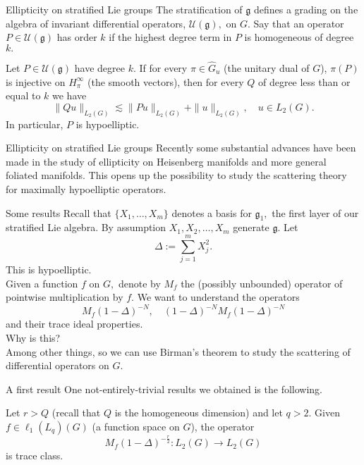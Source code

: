 \documentclass{beamer}
\numberwithin{equation}{section}
\theoremstyle{plain}
\theoremstyle{plain}
\theoremstyle{definition}
\theoremstyle{plain}
\theoremstyle{plain}
\theoremstyle{definition}
\newcommand{\Uc}{\mathcal{U}}
\newcommand{\gf}{\mathfrak{g}}
\begin{document}
\begin{frame}{Ellipticity on stratified Lie groups}
  The stratification of $\gf$ defines a grading on the algebra of invariant differential operators, $\Uc(\gf),$ on $G.$
  Say that an operator $P\in \Uc(\gf)$ has order $k$ if the highest degree term in $P$ is homogeneous of degree $k.$

  \begin{theorem}
    Let $P \in \Uc(\gf)$ have degree $k.$ If for every $\pi \in \widehat{G}_u$ (the unitary dual of $G$), $\pi(P)$
    is injective on $H^{\infty}_\pi$ (the smooth vectors), then for every $Q$ of degree less than or equal to $k$ we have
    \[
      \|Qu\|_{L_2(G)} \lesssim \|Pu\|_{L_2(G)}+\|u\|_{L_2(G)},\quad u\in L_2(G).
    \]
    In particular, $P$ is hypoelliptic.
  \end{theorem}
\end{frame}

\begin{frame}{Ellipticity on stratified Lie groups}
  Recently some substantial advances have been made in the study of ellipticity on Heisenberg manifolds and more general foliated manifolds.
  \pause
  This opens up the possibility to study the scattering theory for maximally hypoelliptic operators.
\end{frame}

\begin{frame}{Some results}
Recall that $\{X_1,\ldots,X_m\}$ denotes a basis for $\gf_1,$ the first layer of our stratified Lie algebra. By assumption $X_1,X_2,\ldots,X_m$ generate $\gf.$ Let
\[
  \Delta := \sum_{j=1}^m X_j^2.
\]
This is hypoelliptic.\\
\pause
Given a function $f$ on $G,$ denote by $M_f$ the (possibly unbounded) operator of pointwise multiplication by $f.$ We want to understand the operators
\[
  M_f(1-\Delta)^{-N},\quad (1-\Delta)^{-N}M_f(1-\Delta)^{-N}
\]
and their trace ideal properties.\\
\pause
Why is this?\\
\pause
Among other things, so we can use Birman's theorem to study the scattering of differential operators on $G.$
\end{frame}

\begin{frame}{A first result}
One not-entirely-trivial results we obtained is the following.
\begin{theorem}
  Let $r>Q$ (recall that $Q$ is the homogeneous dimension) and let $q>2.$ Given $f \in \ell_1(L_q)(G)$ {\color{red}(a function space on $G$)}, the operator
  \[
M_f(1-\Delta)^{-\frac{r}{2}}:L_2(G)\to L_2(G)
  \]
  is trace class.
\end{theorem}
\end{frame}
\end{document}
